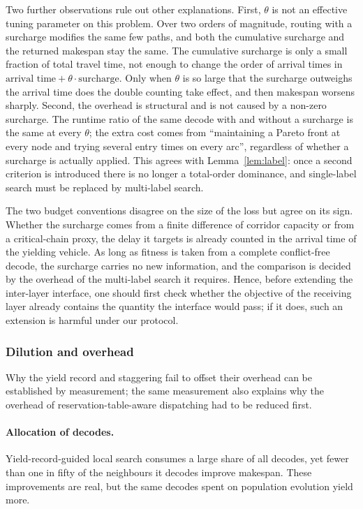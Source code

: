 \documentclass[manuscript,screen,review]{acmart}
\begin{document}
Two further observations rule out other explanations. First, $\theta$ is not an effective tuning parameter on this problem. Over two orders of magnitude, routing with a surcharge modifies the same few paths, and both the cumulative surcharge and the returned makespan stay the same. The cumulative surcharge is only a small fraction of total travel time, not enough to change the order of arrival times in $\text{arrival time}+\theta\cdot\text{surcharge}$. Only when $\theta$ is so large that the surcharge outweighs the arrival time does the double counting take effect, and then makespan worsens sharply.
Second, the overhead is structural and is not caused by a non-zero surcharge. The runtime ratio of the same decode with and without a surcharge is the same at every $\theta$; the extra cost comes from ``maintaining a Pareto front at every node and trying several entry times on every arc'', regardless of whether a surcharge is actually applied. This agrees with Lemma~\ref{lem:label}: once a second criterion is introduced there is no longer a total-order dominance, and single-label search must be replaced by multi-label search.

The two budget conventions disagree on the size of the loss but agree on its sign. Whether the surcharge comes from a finite difference of corridor capacity or from a critical-chain proxy, the delay it targets is already counted in the arrival time of the yielding vehicle. As long as fitness is taken from a complete conflict-free decode, the surcharge carries no new information, and the comparison is decided by the overhead of the multi-label search it requires.
Hence, before extending the inter-layer interface, one should first check whether the objective of the receiving layer already contains the quantity the interface would pass; if it does, such an extension is harmful under our protocol.

\subsubsection{Dilution and overhead}
\label{sec:whycost}

Why the yield record and staggering fail to offset their overhead can be established by measurement; the same measurement also explains why the overhead of reservation-table-aware dispatching had to be reduced first.

\paragraph{Allocation of decodes.}
Yield-record-guided local search consumes a large share of all decodes, yet fewer than one in fifty of the neighbours it decodes improve makespan. These improvements are real, but the same decodes spent on population evolution yield more.
\end{document}
